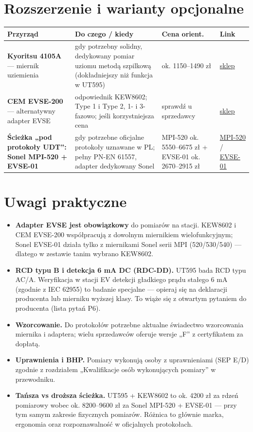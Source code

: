 \documentclass[11pt]{article}
\newcommand{\key}[1]{\textbf{\color{navy}#1}}
\begin{document}
\section{Rozszerzenie i warianty opcjonalne}
\footnotesize
\begin{tabularx}{\linewidth}{@{}p{3.15cm} Y p{1.9cm} p{1.25cm}@{}}
\toprule
\textbf{Przyrząd} & \textbf{Do czego / kiedy} & \textbf{Cena orient.} & \textbf{Link} \\
\midrule
\key{Kyoritsu 4105A} — miernik uziemienia & gdy potrzebny solidny, dedykowany pomiar uziomu metodą szpilkową (dokładniejszy niż funkcja w UT595) & ok. 1150–1490 zł & \href{https://centrummiernictwa.pl/produkt/kew4105a-miernik-rezystancji-uziemienia-kyoritsu/}{sklep} \\
\addlinespace
\key{CEM EVSE-200} — alternatywny adapter EVSE & odpowiednik KEW8602; Type 1 i Type 2, 1- i 3-fazowo; jeśli korzystniejsza cena & sprawdź u sprzedawcy & \href{https://termoplus.pl/evse-200.html}{sklep} \\
\addlinespace
\key{Ścieżka „pod protokoły UDT'': Sonel MPI-520 + EVSE-01} & gdy potrzebne oficjalne protokoły uznawane w PL; pełny PN-EN 61557, adapter dedykowany Sonel & MPI-520 ok. 5550–6675 zł + EVSE-01 ok. 2670–2915 zł & \href{https://www.ceneo.pl/oferty/sonel-mpi-520}{MPI-520} / \href{https://sonel.pl/en/product/adapter-for-testing-vehicle-charging-stations-sonel-evse-01}{EVSE-01} \\
\bottomrule
\end{tabularx}
\normalsize

\section{Uwagi praktyczne}
\begin{itemize}
\item \key{Adapter EVSE jest obowiązkowy} do pomiarów na stacji. KEW8602 i CEM EVSE-200 współpracują z dowolnym miernikiem wielofunkcyjnym; Sonel EVSE-01 działa tylko z miernikami Sonel serii MPI (520/530/540) — dlatego w zestawie tanim wybrano KEW8602.
\item \key{RCD typu B i detekcja 6 mA DC (RDC-DD).} UT595 bada RCD typu AC/A. Weryfikacja w stacji EV detekcji gładkiego prądu stałego 6 mA (zgodnie z IEC 62955) to badanie specjalne — opieraj się na deklaracji producenta lub mierniku wyższej klasy. To wiąże się z otwartym pytaniem do producenta (lista pytań P6).
\item \key{Wzorcowanie.} Do protokołów potrzebne aktualne świadectwo wzorcowania miernika i adaptera; wielu sprzedawców oferuje wersje „F'' z certyfikatem za dopłatą.
\item \key{Uprawnienia i BHP.} Pomiary wykonują osoby z uprawnieniami (SEP E/D) zgodnie z rozdziałem „Kwalifikacje osób wykonujących pomiary'' w przewodniku.
\item \key{Tańsza vs droższa ścieżka.} UT595 + KEW8602 to ok. 4200 zł za rdzeń pomiarowy wobec ok. 8200–9600 zł za Sonel MPI-520 + EVSE-01 — przy tym samym zakresie fizycznych pomiarów. Różnica to głównie marka, ergonomia oraz rozpoznawalność w oficjalnych protokołach.
\end{itemize}
\end{document}
